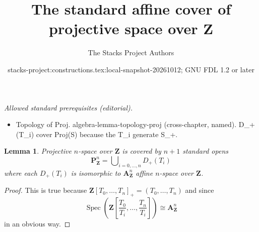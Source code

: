 \documentclass{stacks-project}
\title{The standard affine cover of projective space over Z}
\author{The Stacks Project Authors}
\date{stacks-project:constructions.tex:local-snapshot-20261012; GNU FDL 1.2 or later}
\theoremstyle{plain}
\newtheorem{lemma}[subsection]{Lemma}
\theoremstyle{definition}
\theoremstyle{remark}
\numberwithin{equation}{subsection}
\def\Spec{\mathop{\mathrm{Spec}}}
\begin{document}
\maketitle
\noindent\textit{Allowed standard prerequisites (editorial).}\begin{itemize}
\item Topology of Proj. algebra-lemma-topology-proj (cross-chapter, named). D\_+(T\_i) cover Proj(S) because the T\_i generate S\_+.
\end{itemize}\medskip
\begin{lemma}
\label{lemma-standard-covering-projective-space}
Projective $n$-space over $\mathbf{Z}$ is covered by
$n + 1$ standard opens
$$
\mathbf{P}^n_{\mathbf{Z}} =
\bigcup\nolimits_{i = 0, \ldots, n} D_{+}(T_i)
$$
where each $D_{+}(T_i)$ is isomorphic to $\mathbf{A}^n_{\mathbf{Z}}$
affine $n$-space over $\mathbf{Z}$.
\end{lemma}

\begin{proof}
This is true because
$\mathbf{Z}[T_0, \ldots, T_n]_{+} = (T_0, \ldots, T_n)$ and
since
$$
\Spec
\left(
\mathbf{Z}
\left[\frac{T_0}{T_i}, \ldots, \frac{T_n}{T_i}
\right]
\right)
\cong
\mathbf{A}^n_{\mathbf{Z}}
$$
in an obvious way.
\end{proof}
\end{document}
